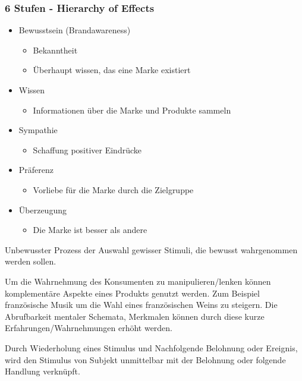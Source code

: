 \subsubsection{6 Stufen - Hierarchy of Effects}
\begin{itemize}
    \item Bewusstsein (Brandawareness)
    \begin{itemize}
        \item Bekanntheit
        \item Überhaupt wissen, das eine Marke existiert
    \end{itemize}
    \item Wissen
    \begin{itemize}
        \item Informationen über die Marke und Produkte sammeln
    \end{itemize}
    \item Sympathie
    \begin{itemize}
        \item Schaffung positiver Eindrücke
    \end{itemize}
    \item Präferenz
    \begin{itemize}
        \item Vorliebe für die Marke durch die Zielgruppe 
    \end{itemize}
    \item Überzeugung
    \begin{itemize}
        \item Die Marke ist besser als andere
    \end{itemize}
\end{itemize}

\begin{definition}
    [Aufmerksamkeit] Unbewusster Prozess der Auswahl gewisser Stimuli, die bewusst wahrgenommen werden sollen.
\end{definition}
\begin{definition}
    [Priming]
Um die Wahrnehmung des Konsumenten zu manipulieren/lenken können komplementäre Aspekte eines Produkts genutzt werden. Zum Beispiel französische Musik um die Wahl eines französischen Weins zu steigern.
Die Abrufbarkeit mentaler Schemata, Merkmalen können durch diese kurze Erfahrungen/Wahrnehmungen erhöht werden.
\end{definition}
\begin{definition}
    [Konditionierung]
Durch Wiederholung eines Stimulus und Nachfolgende Belohnung oder Ereignis, wird den Stimulus von Subjekt unmittelbar mit der Belohnung oder folgende Handlung verknüpft.
\end{definition}


